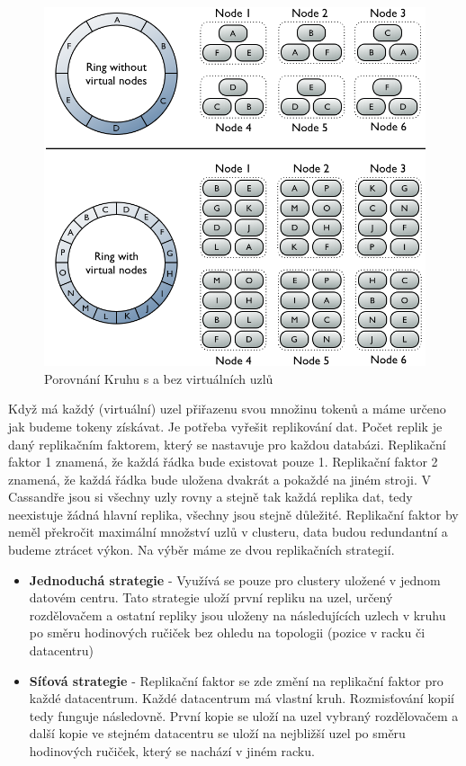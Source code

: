 \begin{figure}[h]
\centering
\includegraphics[scale=0.5]{images/vnodes_compare}
\caption{Porovnání Kruhu s a bez virtuálních uzlů}
\label{fig:vnodes}
\end{figure}

Když má každý (virtuální) uzel přiřazenu svou množinu tokenů a máme určeno jak budeme tokeny získávat. Je potřeba vyřešit replikování dat. Počet replik je daný replikačním faktorem, který se nastavuje pro každou databázi. Replikační faktor 1 znamená, že každá řádka bude existovat pouze 1. Replikační faktor 2 znamená, že každá řádka bude uložena dvakrát a pokaždé na jiném stroji.  V Cassandře jsou si všechny uzly rovny a stejně tak každá replika dat, tedy neexistuje žádná hlavní replika, všechny jsou stejně důležité. Replikační faktor by neměl překročit maximální množství uzlů v clusteru, data budou redundantní a budeme ztrácet výkon. Na výběr máme ze dvou replikačních strategií.


\begin{itemize}
\item \textbf{Jednoduchá strategie} - Využívá se pouze pro clustery uložené v jednom datovém centru. Tato strategie uloží první repliku na uzel, určený rozdělovačem a ostatní repliky jsou uloženy na následujících uzlech v kruhu po směru hodinových ručiček bez ohledu na topologii (pozice v racku či datacentru)
\item \textbf{Síťová strategie} - Replikační faktor se zde změní na replikační faktor pro každé datacentrum. Každé datacentrum má vlastní kruh. Rozmisťování kopií tedy funguje následovně. První kopie se uloží na uzel vybraný rozdělovačem a další kopie ve stejném datacentru se uloží na nejbližší uzel po směru hodinových ručiček, který se nachází v jiném racku. 
\end{itemize}

